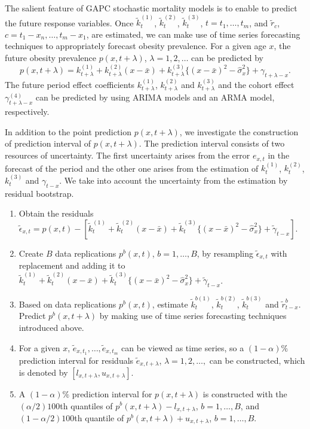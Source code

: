 \documentclass[11pt,letterpaper]{article}
\numberwithin{equation}{section}
\begin{document}
The salient feature of  GAPC stochastic mortality models is to enable to predict the future response variables. Once $\tilde{k}_t^{(1)}$, $\tilde{k}_t^{(2)}$, $\tilde{k}_t^{(3)}$, $t=t_1,\dots,t_m$, and $\tilde{r}_{c}$, $c= t_1-x_n,\dots,t_m-x_1$, are estimated, we can make use of time series forecasting techniques to appropriately forecast obesity prevalence. For a given age $x$, the future obesity prevalence $p(x,t+\lambda)$, $\lambda=1,2,\dots$ can be predicted by
$$
p(x,t+\lambda)=k_{t+\lambda}^{(1)}+ k_{t+\lambda}^{(2)}(x - \bar{x}) + k_{t+\lambda}^{(3)}\{(x - \bar{x})^{2} - \hat\sigma_x^{2}\} + \gamma_{{t+\lambda}-x}.
$$
The future period effect coefficients $k_{t+\lambda}^{(1)}$, $k_{t+\lambda}^{(2)} $ and $k_{t+\lambda}^{(3)}$ and the cohort effect $\gamma_{{t+\lambda}-x}^{(4)}$  can be predicted by using  ARIMA models and an ARMA model, respectively.

In addition to the point prediction $p(x,t+\lambda)$, we investigate the construction of prediction interval of $p(x,t+\lambda)$. The prediction interval consists of two resources of uncertainty. The first uncertainty arises from the error $e_{x,t}$ in the forecast of the period and the other one arises from the estimation of $k_t^{(1)}$, $k_t^{(2)}$, $k_t^{(3)}$ and   $\gamma_{t-x}$. We take into account the uncertainty from the estimation  by residual bootstrap.

\begin{enumerate}
\item Obtain the residuals $\tilde{\epsilon}_{x,t}=p(x,t)-[\tilde{k}_t^{(1)}+ \tilde{k}_t^{(2)}(x - \bar{x}) + \tilde{k}_t^{(3)}\{(x - \bar{x})^{2} - \hat \sigma_x^{2}\}+\tilde{\gamma}_{t-x}]$.

\item Create $B$ data replications $p^b(x,t)$,  $b=1,\dots,B$, by resampling $\tilde{\epsilon}_{x,t}$ with replacement  and adding it to $\tilde{k}_t^{(1)}+ \tilde{k}_t^{(2)}(x - \bar{x}) + \tilde{k}_t^{(3)}\{(x - \bar{x})^{2} - \hat \sigma_x^{2}\}+\tilde{\gamma}_{t-x}$.

\item Based on  data replications $p^b(x,t)$, estimate $\tilde{k}_t^{b(1)}$, $\tilde{k}_t^{b(2)}$, $\tilde{k}_t^{b(3)}$ and $\tilde{r}_{t-x}^b$. %
Predict $p^b(x,t+\lambda)$ by making use of time series forecasting techniques introduced above.

\item
For a given $x$, $\tilde{e}_{x,t_1},\dots,\tilde{e}_{x,t_m}$ can be viewed as time series, so   a $(1-\alpha)\%$ prediction interval for residuals $\tilde{e}_{x,t+\lambda}$, $\lambda=1,2,\dots,$ can be constructed, which is  denoted by $[l_{x,t+\lambda},u_{x,t+\lambda}]$.

\item A $(1-\alpha)\%$ prediction interval for $p(x,t+\lambda)$ is constructed with  the $(\alpha/2)100$th
quantiles of $p^b(x,t+\lambda)-l_{x,t+\lambda}$, $b=1,\dots,B$,
and $(1-\alpha/2)100$th quantile of $p^b(x,t+\lambda)+u_{x,t+\lambda}$, $b=1,\dots,B$.
\end{enumerate}
\end{document}
